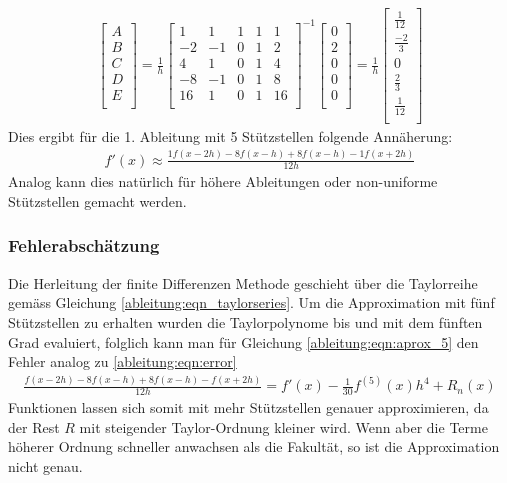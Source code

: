 \begin{align}
\begin{bmatrix}
A \\
B \\
C \\
D \\
E \\
\end{bmatrix}
=
\frac{1}{h}
\begin{bmatrix}
1 & 1 & 1 & 1 & 1 \\
-2 & -1 & 0 & 1 & 2 \\
4 & 1 & 0 & 1 & 4 \\
-8 & -1 & 0 & 1 & 8 \\
16 & 1 & 0 & 1 & 16 \\
\end{bmatrix}^{-1}
\begin{bmatrix}
0 \\
2 \\
0 \\
0 \\
0 \\
\end{bmatrix}
=
\frac{1}{h}
\begin{bmatrix}
\frac{1}{12} \\
\frac{-2}{3} \\
0 \\
\frac{2}{3} \\
\frac{1}{12} \\
\end{bmatrix}
\end{align}
Dies ergibt für die 1. Ableitung mit 5 Stützstellen folgende Annäherung:
\begin{align}
f'(x)  \approx \frac{1f(x-2h) - 8f(x-h) + 8f(x-h) - 1f(x+2h)}{12h}
\label{ableitung:eqn:aprox_5}
\end{align}
Analog kann dies natürlich für höhere Ableitungen oder non-uniforme Stützstellen gemacht werden.
\subsubsection{Fehlerabschätzung}
Die Herleitung der finite Differenzen Methode geschieht über die Taylorreihe gemäss Gleichung \ref{ableitung:eqn_taylorseries}. Um die Approximation mit fünf Stützstellen zu erhalten wurden die Taylorpolynome bis und mit dem fünften Grad evaluiert, folglich kann man für Gleichung \ref{ableitung:eqn:aprox_5} den Fehler analog zu \ref{ableitung:eqn:error}
\begin{align}
\frac{f(x-2h) - 8f(x-h) + 8f(x-h) - f(x+2h)}{12h} = f'(x) - \frac{1}{30} f^{(5)} (x)h^{4}+R_n(x)
\label{ableitung:eqn:error}
\end{align}
Funktionen lassen sich somit mit mehr Stützstellen genauer approximieren, da der Rest $R$ mit steigender Taylor-Ordnung kleiner wird. Wenn aber die Terme höherer Ordnung schneller anwachsen als die Fakultät, so ist die Approximation nicht genau.

